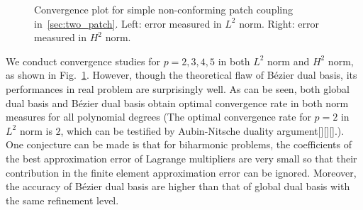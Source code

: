 \documentclass[preprint,12pt]{elsarticle}
\theoremstyle{remark}
\begin{document}
\begin{figure}[hbt]
\begin{subfigure}[b]{0.48\textwidth}
    \end{subfigure}
	\caption{Convergence plot for simple non-conforming patch coupling in~\ref{sec:two_patch}. Left: error measured in $L^2$ norm. Right: error measured in $H^2$ norm.}\label{fig:two_patc_biharmonic_convergence_basic}
\end{figure}

We conduct convergence studies for $p=2,3,4,5$ in both $L^2$ norm and $H^2$ norm, as shown in Fig.~\ref{fig:two_patc_biharmonic_convergence_basic}. However, though the theoretical flaw of B\'ezier dual basis, its performances in real problem are surprisingly well. As can be seen, both global dual basis and B\'ezier dual basis obtain optimal convergence rate in both norm measures for all polynomial degrees (The optimal convergence rate for $p=2$ in $L^2$ norm is $2$, which can be testified by Aubin-Nitsche duality argument[][][].). One conjecture can be made is that for biharmonic problems, the coefficients of the best approximation error of Lagrange multipliers are very small so that their contribution in the finite element approximation error can be ignored. Moreover, the accuracy of B\'ezier dual basis are higher than that of global dual basis with the same refinement level.\par
\end{document}
